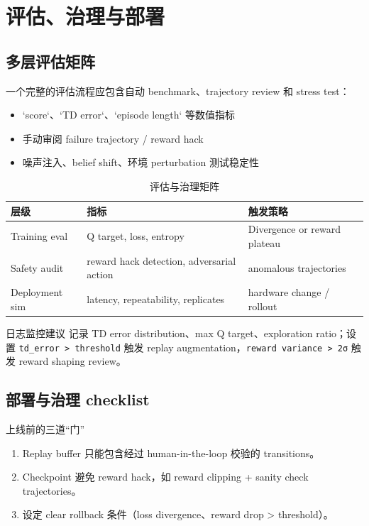 \section{评估、治理与部署}

\subsection{多层评估矩阵}

一个完整的评估流程应包含自动 benchmark、trajectory review 和 stress test：

\begin{itemize}
    \item `score`、`TD error`、`episode length` 等数值指标
    \item 手动审阅 failure trajectory / reward hack
    \item 噪声注入、belief shift、环境 perturbation 测试稳定性
\end{itemize}

\begin{table}[H]
\centering
\begin{tabular}{p{} p{} p{}}
\toprule
层级 & 指标 & 触发策略 \\
\midrule
Training eval & Q target, loss, entropy & Divergence or reward plateau \\
Safety audit & reward hack detection, adversarial action & anomalous trajectories \\
Deployment sim & latency, repeatability, replicates & hardware change / rollout \\
\bottomrule
\end{tabular}
\caption{评估与治理矩阵}
\end{table}

\begin{knowledgebox}{日志监控建议}
记录 TD error distribution、max Q target、exploration ratio；设置 \texttt{td\_error > threshold} 触发 replay augmentation，\texttt{reward variance > 2σ} 触发 reward shaping review。
\end{knowledgebox}

\subsection{部署与治理 checklist}

\begin{warningbox}{上线前的三道“门”}
\begin{enumerate}
    \item Replay buffer 只能包含经过 human-in-the-loop 校验的 transitions。
    \item Checkpoint 避免 reward hack，如 reward clipping + sanity check trajectories。
    \item 设定 clear rollback 条件（loss divergence、reward drop > threshold）。
\end{enumerate}
\end{warningbox}

